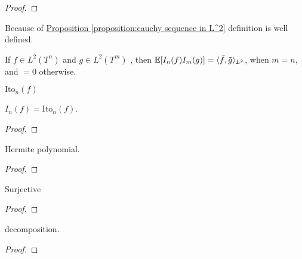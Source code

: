\begin{proof}
    
\end{proof}

\begin{definition}
    
\end{definition}

\begin{remark}
Because of 
\hyperref[proposition:cauchy sequence in L^2]{Proposition \ref*{proposition:cauchy sequence in L^2}} 
definition is well defined. 
\end{remark}

\begin{theorem}
    If $f \in L^2(T^n)$ and $g \in L^2(T^m)$
    , then $\operatorname{\mathbb{E}}[I_n(f) I_m(g)] = \langle \tilde{f}, \tilde{g} \rangle_{L^2}$, 
    when $m=n$, and $=0$ otherwise. 
\end{theorem}

\begin{definition}
    $\text{Ito}_n(f)$
\end{definition}

\begin{theorem}
    $I_n(f) = \text{Ito}_n(f)$. 
\end{theorem}

\begin{proof}
    
\end{proof}

\begin{theorem}
    Hermite polynomial. 
\end{theorem}

\begin{proof}
    
\end{proof}

\begin{theorem}
    Surjective
\end{theorem}

\begin{proof}
    
\end{proof}

\begin{theorem}
    decomposition. 
\end{theorem}

\begin{proof}
    
\end{proof}
